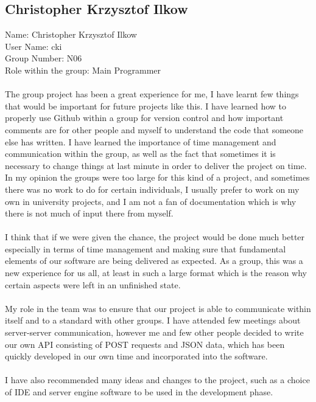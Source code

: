 \documentclass[titlepage]{article}
\begin{document}
{{{{\subsection {Christopher Krzysztof Ilkow}
\normalsize{Name: Christopher Krzysztof Ilkow}
\\
\normalsize{User Name: cki}
\\
\normalsize{Group Number: N06}
\\
\normalsize{Role within the group: Main Programmer}
\\
\\
\normalsize {The group project has been a great experience for me, I have learnt few things that would be important for future projects like this. I have learned how to properly use Github within a group for version control and how important comments are for other people and myself to understand the code that someone else has written. I have learned the importance of time management and communication within the group, as well as the fact that sometimes it is necessary to change things at last minute in order to deliver the project on time.
\\ 
In my opinion the groups were too large for this kind of a project, and sometimes there was no work to do for certain individuals, I usually prefer to work on my own in university projects, and I am not a fan of documentation which is why there is not much of input there from myself.
\\
\\
I think that if we were given the chance, the project would be done much better especially in terms of time management and making sure that fundamental elements of our software are being delivered as expected. As a group, this was a new experience for us all, at least in such a large format which is the reason why certain aspects were left in an unfinished state.
\\
\\
My role in the team was to ensure that our project is able to communicate within itself and to a standard with other groups. I have attended few meetings about server-server communication, however me and few other people decided to write our own API consisting of POST requests and JSON data, which has been quickly developed in our own time and incorporated into the software.
\\
\\
I have also recommended many ideas and changes to the project, such as a choice of IDE and server engine software to be used in the development phase.
}}}}}
\end{document}
